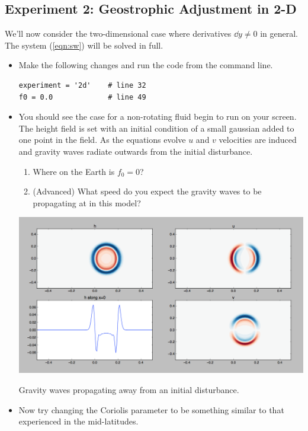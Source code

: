 \documentclass[a4paper, sfsidenotes, twoside]{tufte-handout}
\begin{document}
  \subsection{Experiment 2: Geostrophic Adjustment in 2-D}
  \label{sub:exp2}
  We'll now consider the two-dimensional case where derivatives $\dd{}{y} \ne 0$ in general.
  The system (\ref{eqn:sw}) will be solved in full.
  \begin{itemize}
    \item Make the following changes and run the code from the command line.
    \begin{verbatim}
experiment = '2d'    # line 32
f0 = 0.0             # line 49
    \end{verbatim}
    \item You should see the case for a non-rotating fluid begin to run on
    your screen.  The height field is set with an initial condition of a small
    gaussian added to one point in the field.  As the equations evolve $u$ and
    $v$ velocities are induced and gravity waves radiate outwards from the initial disturbance.
    \begin{enumerate}
      \item Where on the Earth is $f_0 = 0$?
      \item (Advanced) What speed do you expect the gravity waves to be propagating at in this model?
    \end{enumerate}
    \begin{marginfigure}
      \includegraphics{gravity_waves}
      \caption{Gravity waves propagating away from an initial disturbance.}
      \label{fig:gravwaves}
    \end{marginfigure}
    \item Now try changing the Coriolis parameter to be something similar to that experienced in the mid-latitudes.
    \begin{enumerate}

\end{enumerate}
\end{itemize}
\end{document}
